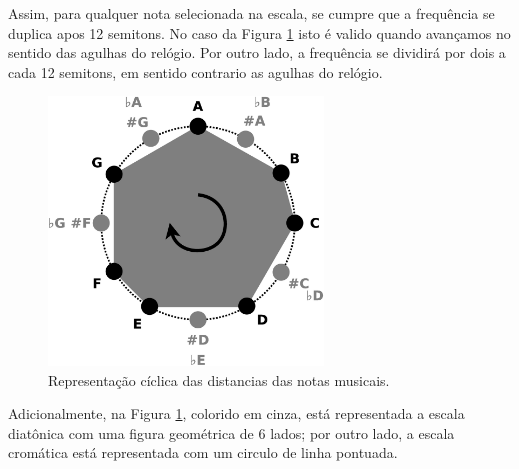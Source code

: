 Assim, para qualquer nota selecionada na escala, 
se cumpre que a frequência se duplica apos 12 semitons.
No caso da Figura \ref{fig:circulonotas} isto é valido quando avançamos no sentido das agulhas do relógio.
Por outro lado, a frequência se dividirá por dois a cada 12 semitons,
em sentido contrario as agulhas do relógio.
    \begin{figure}[h]
        \centering
        \includegraphics[width=0.65\textwidth]{chapters/cap-musica-basica/circulonotas.eps}
        \caption{Representação cíclica das distancias das notas musicais.}
        \label{fig:circulonotas}
    \end{figure}

Adicionalmente, 
na Figura \ref{fig:circulonotas}, colorido em cinza, 
está representada a escala diatônica com uma figura geométrica de 6 lados; 
por outro lado, a escala cromática está representada com um circulo de linha pontuada.


